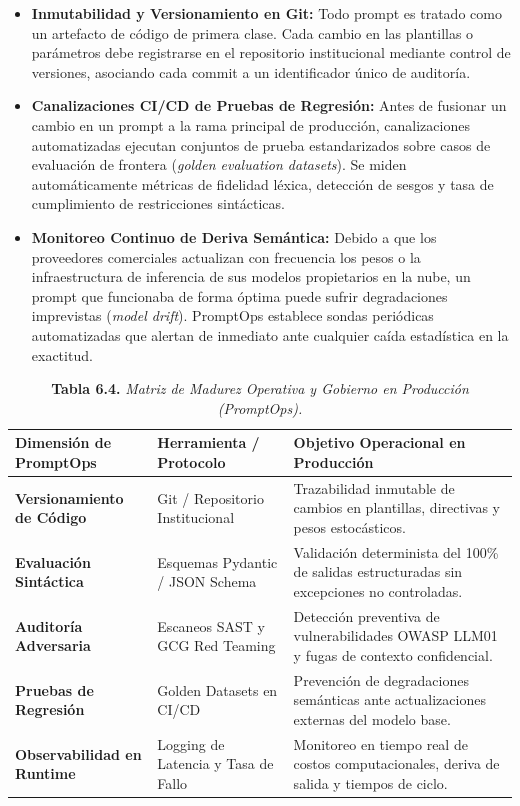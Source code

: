 \begin{itemize}
    \item \textbf{Inmutabilidad y Versionamiento en Git:} Todo prompt es tratado como un artefacto de código de primera clase. Cada cambio en las plantillas o parámetros debe registrarse en el repositorio institucional mediante control de versiones, asociando cada commit a un identificador único de auditoría.
    \item \textbf{Canalizaciones CI/CD de Pruebas de Regresión:} Antes de fusionar un cambio en un prompt a la rama principal de producción, canalizaciones automatizadas ejecutan conjuntos de prueba estandarizados sobre casos de evaluación de frontera (\textit{golden evaluation datasets}). Se miden automáticamente métricas de fidelidad léxica, detección de sesgos y tasa de cumplimiento de restricciones sintácticas.
    \item \textbf{Monitoreo Continuo de Deriva Semántica:} Debido a que los proveedores comerciales actualizan con frecuencia los pesos o la infraestructura de inferencia de sus modelos propietarios en la nube, un prompt que funcionaba de forma óptima puede sufrir degradaciones imprevistas (\textit{model drift}). PromptOps establece sondas periódicas automatizadas que alertan de inmediato ante cualquier caída estadística en la exactitud.
\end{itemize}

\begin{table}[htpb!]
\centering
\small
\renewcommand{\arraystretch}{1.3}
\begin{tabularx}{\textwidth}{>{\raggedright\arraybackslash\bfseries}p{3.2cm} >{\raggedright\arraybackslash}p{3.8cm} >{\raggedright\arraybackslash}X}
\toprule
Dimensión de PromptOps & Herramienta / Protocolo & Objetivo Operacional en Producción \\
\midrule
Versionamiento de Código & Git / Repositorio Institucional & Trazabilidad inmutable de cambios en plantillas, directivas y pesos estocásticos. \\
Evaluación Sintáctica & Esquemas Pydantic / JSON Schema & Validación determinista del 100\% de salidas estructuradas sin excepciones no controladas. \\
Auditoría Adversaria & Escaneos SAST y GCG Red Teaming & Detección preventiva de vulnerabilidades OWASP LLM01 y fugas de contexto confidencial. \\
Pruebas de Regresión & Golden Datasets en CI/CD & Prevención de degradaciones semánticas ante actualizaciones externas del modelo base. \\
Observabilidad en Runtime & Logging de Latencia y Tasa de Fallo & Monitoreo en tiempo real de costos computacionales, deriva de salida y tiempos de ciclo. \\
\bottomrule
\end{tabularx}
\caption{\textbf{Tabla 6.4.} \textit{Matriz de Madurez Operativa y Gobierno en Producción (PromptOps).}}
\label{tab:promptops_matrix}
\end{table}

